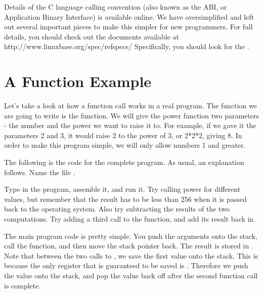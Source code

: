 \begin{sidebar}
Details of the C language calling convention 
(also known as the ABI, or 
Application Binary Interface) is available online.  We have oversimplified and left
out several important pieces to make this simpler for new programmers.
For full details, you should check out the documents available at
http://www.linuxbase.org/spec/refspecs/  Specifically, you should look
for the .
\end{sidebar}

\section{A Function Example}

Let's take a look at how a function call works in a real program.  The
function we are going to write is the 
function.  We will give the power function two parameters -
the number and the power we want to raise it to.  For example,
if we gave it the parameters 2 and 3, it would raise 2 to the
power of 3, or 2*2*2, giving 8.  In order to make this
program simple, we will only allow numbers 1 and greater.

The following is the code for the complete program.  As usual,
an explanation follows.  Name the file .

\begin{simpletyping}

\end{simpletyping}

Type in the program, assemble it, and run it.  Try calling
power for different values, but remember that the result
has to be less than 256 when it is passed back to the operating
system.  Also try subtracting the results of the two 
computations.  Try adding a third call to the 
 function, and add its result
back in.  

The main program code is pretty simple.  You push the 
arguments onto the stack, call the function, and then move
the stack pointer back.  The result is stored in {\eaxReg}.
Note that between the two calls to ,
we save the first value onto the stack.  This is because the
only register that is guaranteed to be saved is {\ebpRegIdx}.
Therefore we push the value onto the stack, and pop the value 
back off after the second function call is complete.


